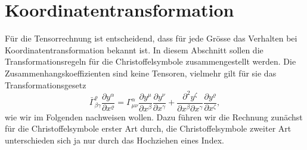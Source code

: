 %
%
%
\section{Koordinatentransformation}
Für die Tensorrechnung ist entscheidend, dass für jede Grösse das Verhalten
bei Koordinatentransformation bekannt ist.
In diesem Abschnitt sollen die Transformationsregeln für die
Christoffelsymbole zusammengestellt werden.
Die Zusammenhangskoeffizienten sind keine Tensoren, vielmehr gilt für sie das
Transformationsgesetz
\[
\bar\Gamma^\varrho_{\beta\gamma}
\frac{\partial y^\alpha}{\partial x^\varrho}
=
\Gamma^\alpha_{\mu\nu}
\frac{\partial y^\mu}{\partial x^\beta}
\frac{\partial y^\nu}{\partial x^\gamma}
+
\frac{\partial^2y^\zeta}{\partial x^\beta\partial x^\gamma}
\frac{\partial y^\varrho}{\partial x^\zeta},
\]
wie wir im Folgenden nachweisen wollen.
Dazu führen wir die Rechnung zunächst für die Christoffelsymbole
erster Art durch, die Christoffelsymbole zweiter Art unterschieden sich
ja nur durch das Hochziehen eines Index.

